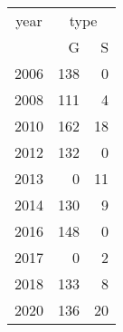 \footnotesize\begin{tabular}[t]{lrr}
\toprule
\multicolumn{1}{c}{year} & \multicolumn{2}{c}{type} \\
\cmidrule(l{3pt}r{3pt}){1-1} \cmidrule(l{3pt}r{3pt}){2-3}
  & G & S\\
\midrule
2006 & 138 & 0\\
2008 & 111 & 4\\
2010 & 162 & 18\\
2012 & 132 & 0\\
2013 & 0 & 11\\
2014 & 130 & 9\\
2016 & 148 & 0\\
2017 & 0 & 2\\
2018 & 133 & 8\\
2020 & 136 & 20\\
\bottomrule
\end{tabular}
